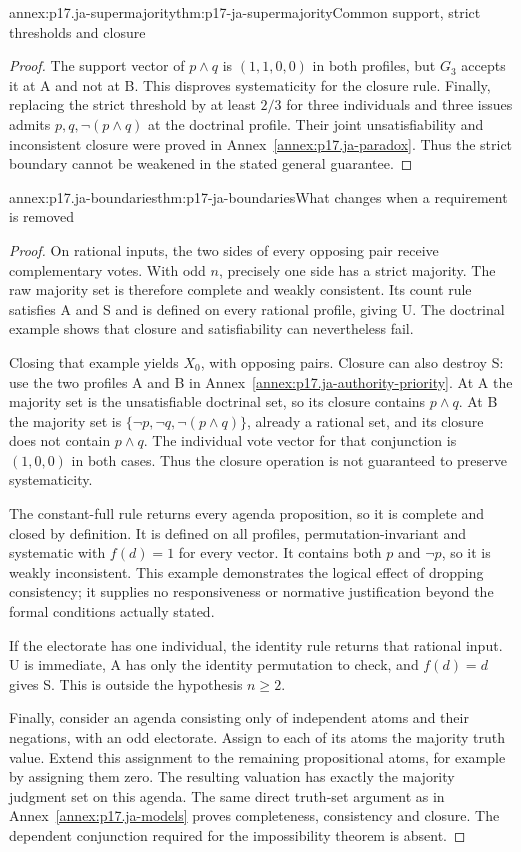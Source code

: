 \begin{annexitem}{annex:p17.ja-supermajority}{thm:p17-ja-supermajority}{Common support, strict thresholds and closure}
\begin{proof}
The support vector of \(p\land q\) is \((1,1,0,0)\) in both profiles, but
\(G_3\) accepts it at A and not at B. This disproves systematicity for the
closure rule. Finally, replacing the strict threshold by at least \(2/3\)
for three individuals and three issues admits \(p,q,\neg(p\land q)\) at
the doctrinal profile. Their joint unsatisfiability and inconsistent closure
were proved in Annex~\ref{annex:p17.ja-paradox}. Thus the strict boundary
cannot be weakened in the stated general guarantee.
\end{proof}
\end{annexitem}

\begin{annexitem}{annex:p17.ja-boundaries}{thm:p17-ja-boundaries}{What changes when a requirement is removed}
\begin{proof}
On rational inputs, the two sides of every opposing pair receive complementary
votes. With odd \(n\), precisely one side has a strict majority. The raw
majority set is therefore complete and weakly consistent. Its count rule
satisfies A and S and is defined on every rational profile, giving U. The
doctrinal example shows that closure and satisfiability can nevertheless fail.

Closing that example yields \(X_0\), with opposing pairs. Closure can also
destroy S: use the two profiles A and B in
Annex~\ref{annex:p17.ja-authority-priority}. At A the majority set is the
unsatisfiable doctrinal set, so its closure contains \(p\land q\). At B the
majority set is \(\{\neg p,\neg q,\neg(p\land q)\}\), already a rational
set, and its closure does not contain \(p\land q\). The individual vote
vector for that conjunction is \((1,0,0)\) in both cases. Thus the closure
operation is not guaranteed to preserve systematicity.

The constant-full rule returns every agenda proposition, so it is complete
and closed by definition. It is defined on all profiles, permutation-invariant
and systematic with \(f(d)=1\) for every vector. It contains both \(p\) and
\(\neg p\), so it is weakly inconsistent. This example demonstrates the
logical effect of dropping consistency; it supplies no responsiveness or
normative justification beyond the formal conditions actually stated.

If the electorate has one individual, the identity rule returns that rational
input. U is immediate, A has only the identity permutation to check, and
\(f(d)=d\) gives S. This is outside the hypothesis \(n\geq2\).

Finally, consider an agenda consisting only of independent atoms and their
negations, with an odd electorate. Assign to each of its atoms the majority
truth value. Extend this assignment to the remaining propositional atoms, for
example by assigning them zero. The resulting valuation has exactly the
majority judgment set on this agenda. The same direct truth-set argument as
in Annex~\ref{annex:p17.ja-models} proves completeness, consistency and closure.
The dependent conjunction required for the impossibility theorem is absent.
\end{proof}
\end{annexitem}
